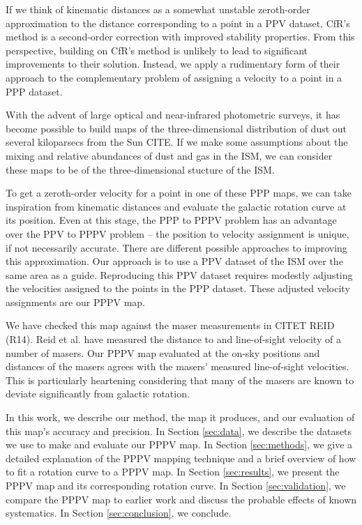 If we think of kinematic distances as a somewhat unstable zeroth-order approximation to the distance corresponding to a point in a PPV dataset, CfR's method is a second-order correction with improved stability properties.
From this perspective, building on CfR's method is unlikely to lead to  significant improvements to their solution.
Instead, we apply a rudimentary form of their approach to the complementary problem of assigning a velocity to a point in a PPP dataset.

With the advent of large optical and near-infrared photometric surveys, it has become possible to build maps of the three-dimensional distribution of dust out several kiloparsecs from the Sun CITE.
If we make some assumptions about the mixing and relative abundances of dust and gas in the ISM, we can consider these maps to be of the three-dimensional stucture of the ISM. 

To get a zeroth-order velocity for a point in one of these PPP maps, we can take inspiration from kinematic distances and evaluate the galactic rotation curve at its position. 
Even at this stage, the PPP to PPPV problem has an advantage over the PPV to PPPV problem -- the position to velocity assignment is unique, if not necessarily accurate.
There are different possible approaches to improving this approximation.
Our approach is to use a PPV dataset of the ISM over the same area as a guide.
Reproducing this PPV dataset requires modestly adjusting the velocities assigned to the points in the PPP dataset.
These adjusted velocity assignments are our PPPV map.

We have checked this map against the maser measurements in CITET REID (R14). 
Reid et al. have measured the distance to and line-of-sight velocity of a number of masers.
Our PPPV map evaluated at the on-sky positions and distances of the masers agrees with the masers' measured line-of-sight velocities.
This is particularly heartening considering that many of the masers are known to deviate significantly from galactic rotation.

In this work, we describe our method, the map it produces, and our evaluation of this map's accuracy and precision.
In Section \ref{sec:data}, we describe the datasets we use to make and evaluate our PPPV map.
In Section \ref{sec:methods}, we give a detailed explanation of the PPPV mapping technique and a brief overview of how to fit a rotation curve to a PPPV map.
In Section \ref{sec:results}, we present the PPPV map and its corresponding rotation curve.
In Section \ref{sec:validation}, we compare the PPPV map to earlier work and discuss the probable effects of known systematics.
In Section \ref{sec:conclusion}, we conclude.